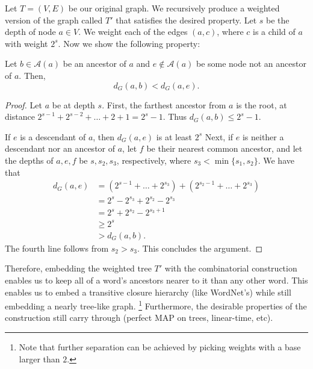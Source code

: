 Let $T = (V,E)$ be our original graph. We recursively produce a weighted version of the graph called $T'$ that satisfies the desired property. Let $s$ be the depth of node $a \in V$. We weight each of the edges $(a,c)$, where $c$ is a child of $a$ with weight $2^s$. Now we show the following property: 

\begin{proposition}
Let $b \in \mathcal{A}(a)$ be an ancestor of $a$ and $e \not\in \mathcal{A}(a)$ be some node not an ancestor of $a$. Then,
\[d_G(a,b) < d_G(a,e).\]
\end{proposition}
\begin{proof}
Let $a$ be at depth $s$. First, the farthest ancestor from $a$ is the root, at distance $2^{s-1}+2^{s-2}+ \ldots + 2+1 = 2^s-1$. Thus $d_G(a,b) \leq 2^s-1$. 

If $e$ is a descendant of $a$, then $d_G(a,e)$ is at least $2^s$ Next, if $e$ is neither a descendant nor an ancestor of $a$, let $f$ be their nearest common ancestor, and let the depths of $a,e,f$ be $s,s_2,s_3$, respectively, where $s_3 < \min\{s_1,s_2\}$. We have that 
\begin{align*}
d_G(a,e) &= (2^{s-1}+\ldots+2^{s_3}) + (2^{s_2-1} + \ldots+2^{s_3}) \\
&= 2^{s} - 2^{s_3} + 2^{s_2} - 2^{s_3} \\
&=2^{s} + 2^{s_2} - 2^{s_3+1} \\
&\geq 2^{s} \\
&> d_G(a,b).
\end{align*}
The fourth line follows from $s_2 > s_3$. This concludes the argument.
\end{proof}

Therefore, embedding the weighted tree $T'$ with the combinatorial construction enables us to keep all of a word's ancestors nearer to it than any other word. This enables us to embed a transitive closure hierarchy (like WordNet's) while still embedding a nearly tree-like graph.
\footnote{Note that further separation can be achieved by picking weights with a base larger than $2$.}
Furthermore, the desirable properties of the construction still carry through (perfect MAP on trees, linear-time, etc).



